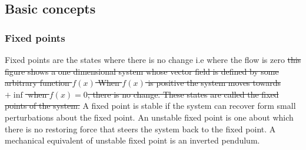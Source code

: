 \subsection{Basic concepts}

\subsubsection{Fixed points}
Fixed points are the states where there is no change i.e where the flow is zero \st{this figure shows a one dimensional system whose vector field is defined by some arbitrary function $f(x)$ When $f(x)$ is positive the system moves towards $+ \inf$ when $f(x) = 0$, there is no change. These states are called the fixed points of the system.} A fixed point is stable if the system can recover form small perturbations about the fixed point.  An unstable fixed point is one about which there is no restoring force that steers the system back to the fixed point.  A mechanical equivalent of unstable fixed point is an inverted pendulum.

